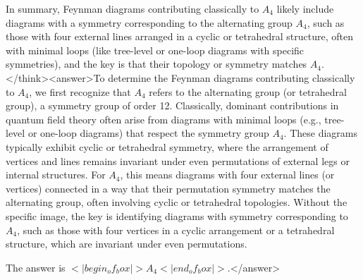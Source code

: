In summary, Feynman diagrams contributing classically to \( A_4 \) likely include diagrams with a symmetry corresponding to the alternating group \( A_4 \), such as those with four external lines arranged in a cyclic or tetrahedral structure, often with minimal loops (like tree-level or one-loop diagrams with specific symmetries), and the key is that their topology or symmetry matches \( A_4 \).</think><answer>To determine the Feynman diagrams contributing classically to \( A_4 \), we first recognize that \( A_4 \) refers to the alternating group (or tetrahedral group), a symmetry group of order 12. Classically, dominant contributions in quantum field theory often arise from diagrams with minimal loops (e.g., tree-level or one-loop diagrams) that respect the symmetry group \( A_4 \). These diagrams typically exhibit cyclic or tetrahedral symmetry, where the arrangement of vertices and lines remains invariant under even permutations of external legs or internal structures. For \( A_4 \), this means diagrams with four external lines (or vertices) connected in a way that their permutation symmetry matches the alternating group, often involving cyclic or tetrahedral topologies. Without the specific image, the key is identifying diagrams with symmetry corresponding to \( A_4 \), such as those with four vertices in a cyclic arrangement or a tetrahedral structure, which are invariant under even permutations.  

The answer is \(<|begin_of_box|>A_4<|end_of_box|>\).</answer>